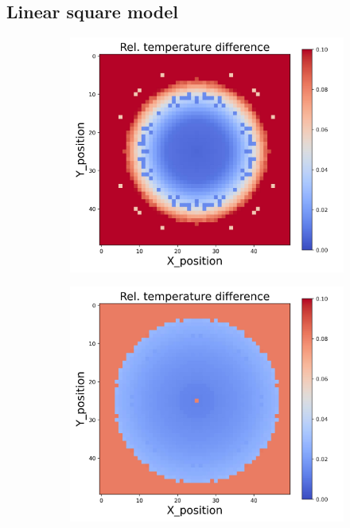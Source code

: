 {\newpage
\subsection{Linear square model}
\begin{figure}[h]
    \centering
    \begin{minipage}{\textwidth}
        \centering
        \begin{subfigure}{0.27\textwidth}
            \centering
            \includegraphics[width=\textwidth]{figures/raw_data/0/lin_square/T_bias.jpg}
        \end{subfigure}
        \begin{subfigure}{0.27\textwidth}
            \centering
            \includegraphics[width=\textwidth]{figures/raw_data/5/lin_square/T_bias.jpg}

\end{subfigure}
\end{minipage}
\end{figure}}
